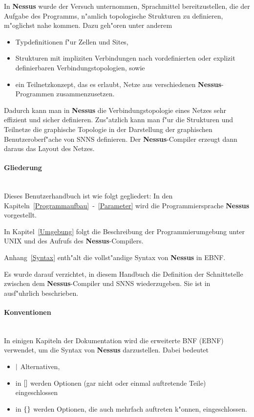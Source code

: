 In {\bf Nessus} wurde der Versuch unternommen, Sprachmittel
bereitzustellen, die der Aufgabe des Programms, n"amlich topologische
Strukturen zu definieren, m"oglichst nahe kommen. Dazu geh"oren unter
anderem

\begin{itemize}
  \item Typdefinitionen f"ur Zellen und Sites,
  \item Strukturen mit impliziten Verbindungen nach vordefinierten 
	oder explizit definierbaren Verbindungstopologien, sowie
  \item ein Teilnetzkonzept, das es erlaubt, Netze aus verschiedenen {\bf
	Nessus}-Programmen zusammenzusetzen.
\end{itemize}

Dadurch kann man in {\bf Nessus} die Verbindungstopologie eines Netzes
sehr effizient und sicher definieren. Zus"atzlich kann man f"ur die
Strukturen und Teilnetze die graphische Topologie in der Darstellung
der graphischen Benutzeroberf"ache von SNNS definieren. Der {\bf
Nessus}-Compiler erzeugt dann daraus das Layout des Netzes.

\paragraph{Gliederung}
~~\\
Dieses Benutzerhandbuch ist wie folgt gegliedert: 
In den Kapiteln~\ref{Programmaufbau}~-~\ref{Parameter} wird die
Programmiersprache {\bf Nessus} vorgestellt.

In Kapitel~\ref{Umgebung} folgt die Beschreibung der
Programmierumgebung unter UNIX und des Aufrufs des {\bf
Nessus}-Compilers.

Anhang~\ref{Syntax} enth"alt die vollst"andige Syntax von {\bf Nessus}
in EBNF.

Es wurde darauf verzichtet, in diesem Handbuch die Definition der
Schnittstelle zwischen dem {\bf Nessus}-Compiler und SNNS
wiederzugeben. Sie ist in~\cite{SNNSDoku} ausf"uhrlich beschrieben.


\paragraph{Konventionen}
~~\\
In einigen Kapiteln der Dokumentation wird die erweiterte BNF
(EBNF) verwendet, um die Syntax von {\bf Nessus}
darzustellen. Dabei bedeutet

\begin{itemize}
  \item ${\bf |}$ Alternativen,
  \item in  ${\bf []}$ werden Optionen (gar nicht oder einmal auftretende Teile)
        eingeschlossen
  \item in ${\bf \{\}}$ werden Optionen, die auch mehrfach auftreten k"onnen, eingeschlossen.
\end{itemize}

